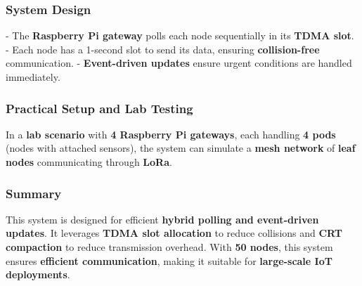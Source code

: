 \documentclass[12pt,onecolumn]{IEEEtran} %
\begin{document}
\subsubsection{System Design}

- The \textbf{Raspberry Pi gateway} polls each node sequentially in its \textbf{TDMA slot}.
- Each node has a 1-second slot to send its data, ensuring \textbf{collision-free} communication.
- \textbf{Event-driven updates} ensure urgent conditions are handled immediately.

\subsubsection{Practical Setup and Lab Testing}

In a \textbf{lab scenario} with \textbf{4 Raspberry Pi gateways}, each handling \textbf{4 pods} (nodes with attached sensors), the system can simulate a \textbf{mesh network} of \textbf{leaf nodes} communicating through \textbf{LoRa}.

\subsubsection{Summary}

This system is designed for efficient \textbf{hybrid polling and event-driven updates}. It leverages \textbf{TDMA slot allocation} to reduce collisions and \textbf{CRT compaction} to reduce transmission overhead. With \textbf{50 nodes}, this system ensures \textbf{efficient communication}, making it suitable for \textbf{large-scale IoT deployments}.
\end{document}
